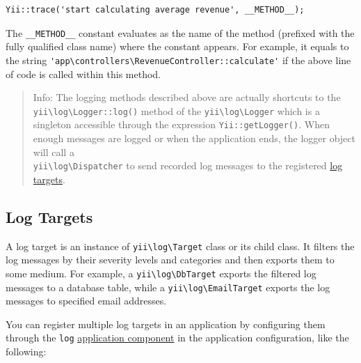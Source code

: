 \lstset{language=php}\begin{lstlisting}
Yii::trace('start calculating average revenue', __METHOD__);
\end{lstlisting}
The \lstinline|__METHOD__| constant evaluates as the name of the method (prefixed with the fully qualified class name) where 
the constant appears. For example, it equals to the string \lstinline|'app\controllers\RevenueController::calculate'| if 
the above line of code is called within this method.

\begin{quote}Info: The logging methods described above are actually shortcuts to the \texttt{yii{\allowbreak{}\textbackslash}log{\allowbreak{}\textbackslash}Logger\allowbreak{}::\allowbreak{}log()} method 
of the \texttt{yii{\allowbreak{}\textbackslash}log{\allowbreak{}\textbackslash}Logger} which is a singleton accessible through the expression \lstinline|Yii::getLogger()|. When
enough messages are logged or when the application ends, the logger object will call a\\
\texttt{yii{\allowbreak{}\textbackslash}log{\allowbreak{}\textbackslash}Dispatcher} to send recorded log messages to the registered \hyperref[runtime-logging.md::::log-targets]{log targets}.

\end{quote}
\subsection{Log Targets \label{runtime-logging.md::log-targets}}
A log target is an instance of \texttt{yii{\allowbreak{}\textbackslash}log{\allowbreak{}\textbackslash}Target} class or its child class. It filters the log messages by their
severity levels and categories and then exports them to some medium. For example, a  \texttt{yii{\allowbreak{}\textbackslash}log{\allowbreak{}\textbackslash}DbTarget}
exports the filtered log messages to a database table, while a \texttt{yii{\allowbreak{}\textbackslash}log{\allowbreak{}\textbackslash}EmailTarget} exports
the log messages to specified email addresses.

You can register multiple log targets in an application by configuring them through the \lstinline|log| \hyperref[structure-application-components.md]{application component}
in the application configuration, like the following:

